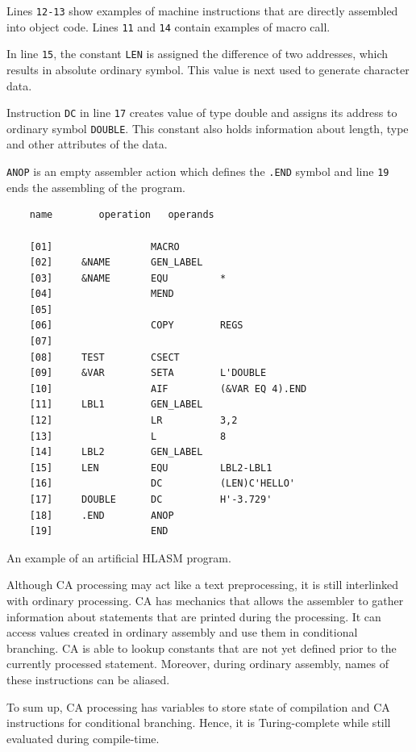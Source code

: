 Lines \verb|12-13| show examples of machine instructions that are directly assembled into object code. Lines \verb|11| and \verb|14| contain examples of macro call.

In line \verb|15|, the constant \verb|LEN| is assigned the difference of two addresses, which results in absolute ordinary symbol. This value is next used to generate character data.

Instruction \verb|DC| in line \verb|17| creates value of type double and assigns its address to ordinary symbol \verb|DOUBLE|. This constant also holds information about length, type and other attributes of the data.  

\verb|ANOP| is an empty assembler action which defines the \verb|.END| symbol and line \verb|19| ends the assembling of the program. 

\begin{listing}[t]
	\begin{verbatim}
	name        operation   operands
	
	[01]                 MACRO                   
	[02]     &NAME       GEN_LABEL
	[03]     &NAME       EQU         *
	[04]                 MEND
	[05]             
	[06]                 COPY        REGS
	[07]             
	[08]     TEST        CSECT
	[09]     &VAR        SETA        L'DOUBLE
	[10]                 AIF         (&VAR EQ 4).END
	[11]     LBL1        GEN_LABEL
	[12]                 LR          3,2
	[13]                 L           8
	[14]     LBL2        GEN_LABEL
	[15]     LEN         EQU         LBL2-LBL1
	[16]                 DC          (LEN)C'HELLO'
	[17]     DOUBLE      DC          H'-3.729'
	[18]     .END        ANOP
	[19]                 END
	\end{verbatim} 
	\caption{An example of an artificial HLASM program.}
	\label{lst:example}
\end{listing}

\vspace{5mm}

Although CA processing may act like a text preprocessing, it is still interlinked with ordinary processing. CA has mechanics that allows the assembler to gather information about statements that are printed during the processing. It can access values created in ordinary assembly and use them in conditional branching. CA is able to lookup constants that are not yet defined prior to the currently processed statement. Moreover, during ordinary assembly, names of these instructions can be aliased.

To sum up, CA processing has variables to store state of compilation and CA instructions for conditional branching. Hence, it is Turing-complete while still evaluated during compile-time.


